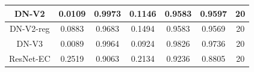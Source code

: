 \documentclass[11pt,a4paper]{article}
\theoremstyle{definition}
\begin{document}
\begin{table}[H]
\begin{tabular}{|c|c|c|c|c|c|c|}
\hline
DN-V2                                               & \textcolor[rgb]{0.129,0.129,0.129}{0.0109 } & \textcolor[rgb]{0.129,0.129,0.129}{0.9973 } & \textcolor[rgb]{0.129,0.129,0.129}{0.1146 }                                                                       & \textcolor[rgb]{0.129,0.129,0.129}{0.9583}                                                                             & \textcolor[rgb]{0.129,0.129,0.129}{0.9597}                                                                       & 20                                                                                                              \\
\hline
DN-V2-reg                                           & \textcolor[rgb]{0.129,0.129,0.129}{0.0883 } & \textcolor[rgb]{0.129,0.129,0.129}{0.9683 } & \textcolor[rgb]{0.129,0.129,0.129}{0.1494 }                                                                       & \textcolor[rgb]{0.129,0.129,0.129}{0.9583}                                                                             & \textcolor[rgb]{0.129,0.129,0.129}{0.9569}                                                                       & 20                                                                                                              \\
\hline
DN-V3                                               & \textcolor[rgb]{0.129,0.129,0.129}{0.0089 } & \textcolor[rgb]{0.129,0.129,0.129}{0.9964 } & \textcolor[rgb]{0.129,0.129,0.129}{0.0924 }                                                                       & \textcolor[rgb]{0.129,0.129,0.129}{0.9826}                                                                             & \textcolor[rgb]{0.129,0.129,0.129}{0.9736}                                                                       & 20                                                                                                              \\
\hline
ResNet-EC                                              & \textcolor[rgb]{0.129,0.129,0.129}{0.2519 } & \textcolor[rgb]{0.129,0.129,0.129}{0.9063 } & \textcolor[rgb]{0.129,0.129,0.129}{0.2134 }                                                                       & \textcolor[rgb]{0.129,0.129,0.129}{0.9236}                                                                             & \textcolor[rgb]{0.129,0.129,0.129}{0.8805}                                                                       & 20                                                                                                              \\

\end{tabular}
\end{table}
\end{document}
